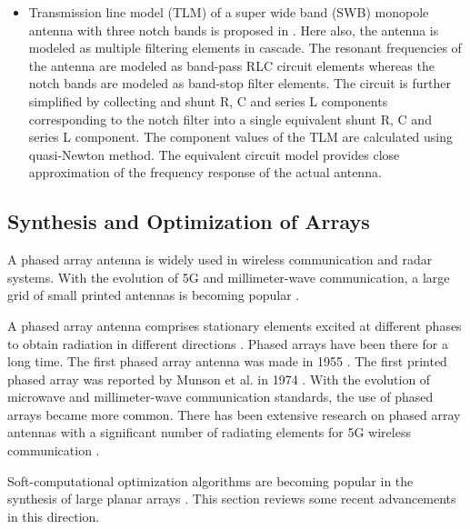 \begin{itemize}
\item Transmission line model (TLM) of a super wide band (SWB) monopole antenna with three notch bands is proposed in \cite{optEqCkt_ads}. Here also, the antenna is modeled as multiple filtering elements in cascade. The resonant frequencies of the antenna are modeled as band-pass RLC circuit elements whereas the notch bands are modeled as band-stop filter elements. The circuit is further simplified by collecting and shunt R, C and series L components corresponding to the notch filter into a single equivalent shunt R, C and series L component. The component values of the TLM are calculated using quasi-Newton method. The equivalent circuit model provides close approximation of the frequency response of the actual antenna.
\end{itemize}

\subsection{Synthesis and Optimization of Arrays} \label{c1sec_lit_surv}

A phased array antenna is widely used in wireless communication and radar systems. With the evolution of 5G and millimeter-wave communication, a large grid of small printed antennas is becoming popular \cite{5gmmwave, 5gmmwave_fr4}.

A phased array antenna comprises stationary elements excited at different phases to obtain radiation in different directions \cite{phasedArrayHandbook}. Phased arrays have been there for a long time. The first phased array antenna was made in 1955 \cite{phasedArray_russia}. The first printed phased array was reported by Munson et al. in 1974 \cite{txmPhasedArray}. With the evolution of microwave and millimeter-wave communication standards, the use of phased arrays became more common. There has been extensive research on phased array antennas with a significant number of radiating elements for 5G wireless communication \cite{mmarrayRrev}.

Soft-computational optimization algorithms are becoming popular in the synthesis of large planar arrays \cite{arrayTradeoffs}. This section reviews some recent advancements in this direction.

